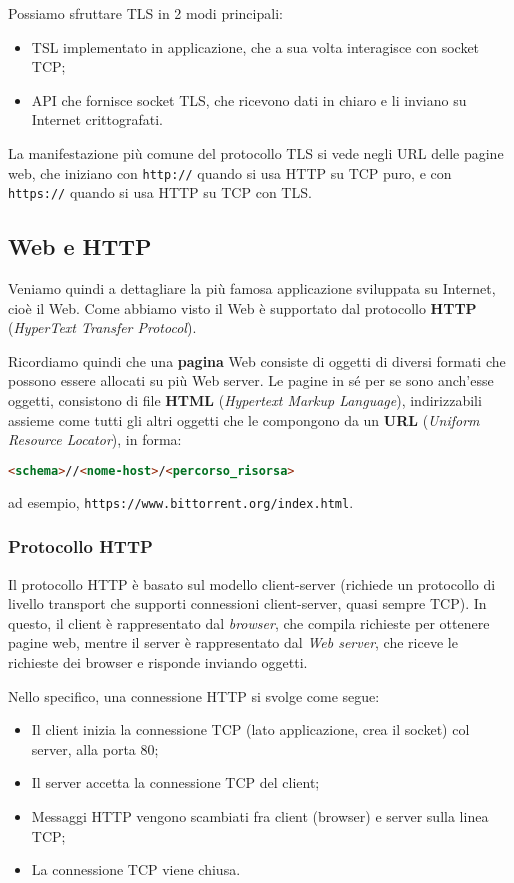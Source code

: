 \documentclass[a4paper,11pt]{article}
\begin{document}
Possiamo sfruttare TLS in 2 modi principali:
\begin{itemize}
	\item TSL implementato in applicazione, che a sua volta interagisce con socket TCP;
	\item API che fornisce socket TLS, che ricevono dati in chiaro e li inviano su Internet crittografati.
\end{itemize}

La manifestazione più comune del protocollo TLS si vede negli URL delle pagine web, che iniziano con \lstinline|http://| quando si usa HTTP su TCP puro, e con \lstinline|https://| quando si usa HTTP su TCP con TLS.

\subsection{Web e HTTP}
Veniamo quindi a dettagliare la più famosa applicazione sviluppata su Internet, cioè il Web.
Come abbiamo visto il Web è supportato dal protocollo \textbf{HTTP} (\textit{HyperText Transfer Protocol}).

Ricordiamo quindi che una \textbf{pagina} Web consiste di oggetti di diversi formati che possono essere allocati su più Web server.
Le pagine in sé per se sono anch'esse oggetti, consistono di file \textbf{HTML} (\textit{Hypertext Markup Language}), indirizzabili assieme come tutti gli altri oggetti che le compongono da un \textbf{URL} (\textit{Uniform Resource Locator}), in forma:
\begin{lstlisting}[language=html, style=codestyle]	
<schema>//<nome-host>/<percorso_risorsa>
\end{lstlisting}
ad esempio, \lstinline|https://www.bittorrent.org/index.html|.

\subsubsection{Protocollo HTTP}
Il protocollo HTTP è basato sul modello client-server (richiede un protocollo di livello transport che supporti connessioni client-server, quasi sempre TCP).
In questo, il client è rappresentato dal \textit{browser}, che compila richieste per ottenere pagine web, mentre il server è rappresentato dal \textit{Web server}, che riceve le richieste dei browser e risponde inviando oggetti.

Nello specifico, una connessione HTTP si svolge come segue:
\begin{itemize}
	\item Il client inizia la connessione TCP (lato applicazione, crea il socket) col server, alla porta 80;
	\item Il server accetta la connessione TCP del client;
	\item Messaggi HTTP vengono scambiati fra client (browser) e server sulla linea TCP;
	\item La connessione TCP viene chiusa.
\end{itemize}
\end{document}
